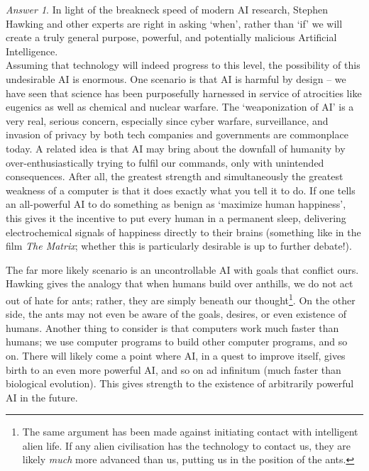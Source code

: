 \documentclass[11pt]{article}
\theoremstyle{remark}
\newtheorem*{answer}{Answer}
\begin{document}
    \begin{answer}
        In light of the breakneck speed of modern AI research, Stephen Hawking and
        other experts are right in asking `when', rather than `if' we will create a
        truly general purpose, powerful, and potentially malicious Artificial
        Intelligence. \\

        Assuming that technology will indeed progress to this level, the possibility
        of this undesirable AI is enormous. One scenario is that AI is harmful by
        design -- we have seen that science has been purposefully harnessed in
        service of atrocities like eugenics as well as chemical and nuclear warfare.
        The `weaponization of AI' is a very real, serious concern, especially since
        cyber warfare, surveillance, and invasion of privacy by both tech companies
        and governments are commonplace today. A related idea is that AI may bring
        about the downfall of humanity by over-enthusiastically trying to fulfil our
        commands, only with unintended consequences. After all, the greatest strength
        and simultaneously the greatest weakness of a computer is that it does
        exactly what you tell it to do. If one tells an all-powerful AI to do
        something as benign as `maximize human happiness', this gives it the
        incentive to put every human in a permanent sleep, delivering electrochemical
        signals of happiness directly to their brains (something like in the film
        \emph{The Matrix}; whether this is particularly desirable is up to further
        debate!).

        The far more likely scenario is an uncontrollable AI with goals that conflict
        ours. Hawking gives the analogy that when humans build over anthills, we do
        not act out of hate for ants; rather, they are simply beneath our
        thought\footnote{The same argument has been made against initiating contact
        with intelligent alien life. If any alien civilisation has the technology to
        contact us, they are likely \emph{much} more advanced than us, putting us in
        the position of the ants.}. On the other side, the ants may not even be aware
        of the goals, desires, or even existence of humans. Another thing to consider
        is that computers work much faster than humans; we use computer programs to
        build other computer programs, and so on. There will likely come a point
        where AI, in a quest to improve itself, gives birth to an even more powerful
        AI, and so on ad infinitum (much faster than biological evolution). This
        gives strength to the existence of arbitrarily powerful AI in the future. \\


\end{answer}
\end{document}
